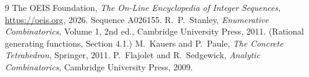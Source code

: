 \documentclass[11pt,a4paper]{article}
\theoremstyle{plain}
\theoremstyle{definition}
\begin{document}
\begin{thebibliography}{9}
 The OEIS Foundation, \emph{The On-Line Encyclopedia of Integer
Sequences}, \url{https://oeis.org}, 2026. Sequence A026155.
 R.~P.~Stanley, \emph{Enumerative Combinatorics}, Volume 1, 2nd ed.,
Cambridge University Press, 2011. (Rational generating functions, Section 4.1.)
 M.~Kauers and P.~Paule, \emph{The Concrete Tetrahedron}, Springer, 2011.
 P.~Flajolet and R.~Sedgewick, \emph{Analytic Combinatorics}, Cambridge
University Press, 2009.
\end{thebibliography}
\end{document}
